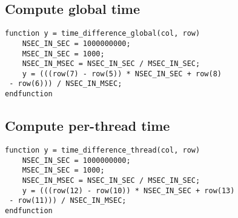 \subsection{Compute global time}
\label{app:global}
\begin{lstlisting}
function y = time_difference_global(col, row)
	NSEC_IN_SEC = 1000000000;
	MSEC_IN_SEC = 1000;
	NSEC_IN_MSEC = NSEC_IN_SEC / MSEC_IN_SEC;
	y = (((row(7) - row(5)) * NSEC_IN_SEC + row(8)
 - row(6))) / NSEC_IN_MSEC;
endfunction
\end{lstlisting}

\subsection{Compute per-thread time}
\label{app:perthread}
\begin{lstlisting}
function y = time_difference_thread(col, row)
	NSEC_IN_SEC = 1000000000;
	MSEC_IN_SEC = 1000;
	NSEC_IN_MSEC = NSEC_IN_SEC / MSEC_IN_SEC;
	y = (((row(12) - row(10)) * NSEC_IN_SEC + row(13)
 - row(11))) / NSEC_IN_MSEC;
endfunction
\end{lstlisting}






